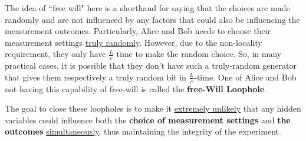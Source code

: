 \documentclass[12pt]{article}
\begin{document}
\begin{definition}
The idea of ``free will" here is a shorthand for saying that the choices are made randomly and are not influenced by any factors that could also be influencing the measurement outcomes. Particularly, Alice and Bob needs to choose their measurement settings \underline{truly randomly}. However, due to the non-locality requirement, they only have $\frac{L}{c}$ time to make the random choice. So, in many practical cases, it is possible that they don't have such a truly-random generator that gives them respectively a truly random bit in $\frac{L}{c}$-time. One of Alice and Bob not having this capability of free-will is called the \textbf{free-Will Loophole}.
\end{definition}

\begin{remark}
The goal to close these loopholes is to make it \underline{extremely unlikely} that any hidden variables could influence both the \textbf{choice of measurement settings} and \textbf{the outcomes} \underline{simultaneously}, thus maintaining the integrity of the experiment.
\end{remark}
\end{document}
